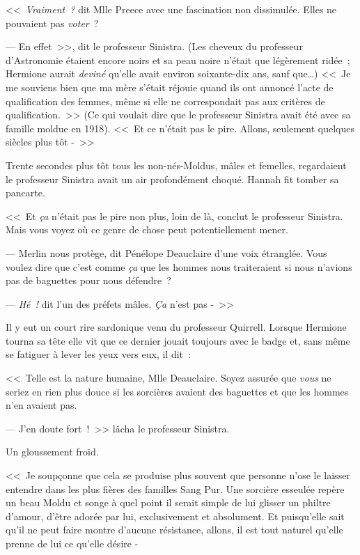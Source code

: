 <<~\emph{Vraiment~?} dit Mlle Preece avec une fascination non dissimulée. Elles ne pouvaient pas \emph{voter}~?

--- En effet~>>, dit le professeur Sinistra. (Les cheveux du professeur d'Astronomie étaient encore noirs et sa peau noire n'était que légèrement ridée~; Hermione aurait \emph{deviné} qu'elle avait environ soixante-dix ans, sauf que…) <<~Je me souviens bien que ma mère s'était réjouie quand ils ont annoncé l'acte de qualification des femmes, même si elle ne correspondait pas aux critères de qualification.~>> (Ce qui voulait dire que le professeur Sinistra avait été avec sa famille moldue en 1918). <<~Et ce n'était pas le pire. Allons, seulement quelques siècles plus tôt -~>>

Trente secondes plus tôt tous les non-nés-Moldus, mâles et femelles, regardaient le professeur Sinistra avait un air profondément choqué. Hannah fit tomber sa pancarte.

<<~Et \emph{ça} n'était pas le pire non plus, loin de là, conclut le professeur Sinistra. Mais vous voyez où ce genre de chose peut potentiellement mener.

--- Merlin nous protège, dit Pénélope Deauclaire d'une voix étranglée. Vous voulez dire que c'est comme \emph{ça} que les hommes nous traiteraient si nous n'avions pas de baguettes pour nous défendre~?

--- \emph{Hé~!} dit l'un des préfets mâles. \emph{Ça} n'est pas -~>>

Il y eut un court rire sardonique venu du professeur Quirrell. Lorsque Hermione tourna sa tête elle vit que ce dernier jouait toujours avec le badge et, sans même se fatiguer à lever les yeux vers eux, il dit~:

<<~Telle est la nature humaine, Mlle Deauclaire. Soyez assurée que \emph{vous} ne seriez en rien plus douce si les sorcières avaient des baguettes et que les hommes n'en avaient pas.

--- J'en doute fort~!~>> lâcha le professeur Sinistra.

Un gloussement froid.

<<~Je soupçonne que cela se produise plus souvent que personne n'ose le laisser entendre dans les plus fières des familles Sang Pur. Une sorcière esseulée repère un beau Moldu et songe à quel point il serait simple de lui glisser un philtre d'amour, d'être adorée par lui, exclusivement et absolument. Et puisqu'elle sait qu'il ne peut faire montre d'aucune résistance, allons, il est tout naturel qu'elle prenne de lui ce qu'elle désire -

